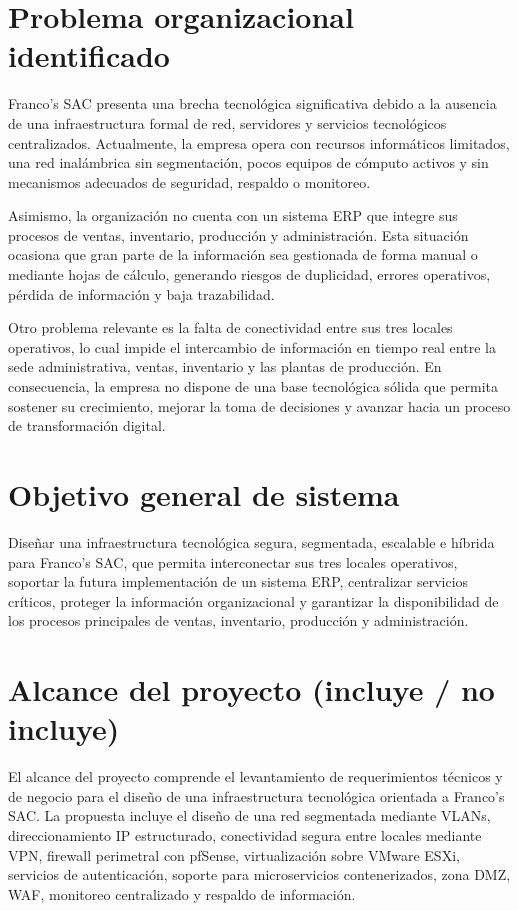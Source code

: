 \documentclass[11pt, a4paper, oneside]{report}
\begin{document}
\section{Problema organizacional identificado}
Franco's SAC presenta una brecha tecnológica significativa debido a la ausencia de una infraestructura formal de red, servidores y servicios tecnológicos centralizados. Actualmente, la empresa opera con recursos informáticos limitados, una red inalámbrica sin segmentación, pocos equipos de cómputo activos y sin mecanismos adecuados de seguridad, respaldo o monitoreo.

Asimismo, la organización no cuenta con un sistema ERP que integre sus procesos de ventas, inventario, producción y administración. Esta situación ocasiona que gran parte de la información sea gestionada de forma manual o mediante hojas de cálculo, generando riesgos de duplicidad, errores operativos, pérdida de información y baja trazabilidad.

Otro problema relevante es la falta de conectividad entre sus tres locales operativos, lo cual impide el intercambio de información en tiempo real entre la sede administrativa, ventas, inventario y las plantas de producción. En consecuencia, la empresa no dispone de una base tecnológica sólida que permita sostener su crecimiento, mejorar la toma de decisiones y avanzar hacia un proceso de transformación digital.
\section{Objetivo general de sistema}
Diseñar una infraestructura tecnológica segura, segmentada, escalable e híbrida para Franco's SAC, que permita interconectar sus tres locales operativos, soportar la futura implementación de un sistema ERP, centralizar servicios críticos, proteger la información organizacional y garantizar la disponibilidad de los procesos principales de ventas, inventario, producción y administración.
\section{Alcance del proyecto (incluye / no incluye)}
El alcance del proyecto comprende el levantamiento de requerimientos técnicos y de negocio para el diseño de una infraestructura tecnológica orientada a Franco's SAC. La propuesta incluye el diseño de una red segmentada mediante VLANs, direccionamiento IP estructurado, conectividad segura entre locales mediante VPN, firewall perimetral con pfSense, virtualización sobre VMware ESXi, servicios de autenticación, soporte para microservicios contenerizados, zona DMZ, WAF, monitoreo centralizado y respaldo de información.
\end{document}
